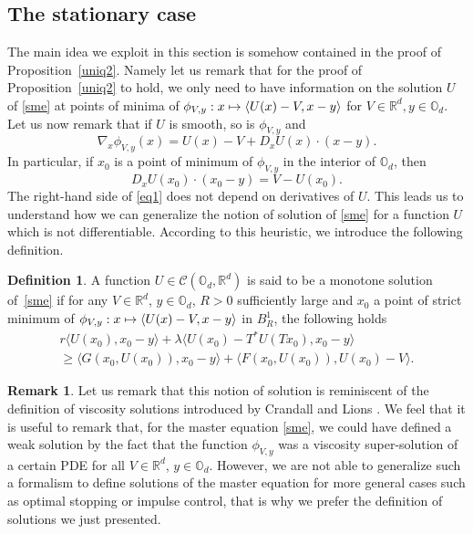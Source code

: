 \documentclass[10pt]{amsart}
\let\mathcal\mathscr
\newcommand\mto{\mathchoice{\longmapsto}{\mapsto}{\mapsto}{\mapsto}}
\theoremstyle{definition}
\newtheorem{Def}{Definition}[section]
\newtheorem{Rem}{Remark}[section]
\begin{document}
\subsection{The stationary case}
The main idea we exploit in this section is somehow contained in the proof of Proposition~\ref{uniq2}. Namely let us remark that for the proof of Proposition~\ref{uniq2} to hold, we only need to have information on the solution $U$ of \eqref{sme} at points of minima of $\phi_{V,y}: x \mto \langle U(x)-V, x-y\rangle$ for $V \in \mathbb{R}^d, y \in \mathbb{O}_d$. Let us now remark that if $U$ is smooth, so is $\phi_{V,y}$ and
\begin{equation*}
\nabla_x \phi_{V,y}(x) = U(x)-V+D_x U(x)\cdot(x-y).
\end{equation*}
In particular, if $x_0$ is a point of minimum of $\phi_{V,y}$ in the interior of $\mathbb{O}_d$, then
\begin{equation}\label{eq1}
D_x U(x_0)\cdot(x_0-y) =V-U(x_0).
\end{equation}
The right-hand side of \eqref{eq1} does not depend on derivatives of $U$. This leads us to understand how we can generalize the notion of solution of \eqref{sme} for a function $U$ which is not differentiable. According to this heuristic, we introduce the following definition.
\begin{Def}\label{defmons}
A function $U \in \mathcal{C}(\mathbb{O}_d, \mathbb{R}^d)$ is said to be a monotone solution of~\eqref{sme} if for any $V \in \mathbb{R}^d$, $y \in \mathbb{O}_d$, $R>0$ sufficiently large and $x_0$ a point of strict minimum of $\phi_{V,y}: x \mto \langle U(x)-V, x-y\rangle$ in $B^1_R$, the following holds
\begin{multline}\label{smon}
r\langle U(x_0), x_0-y\rangle + \lambda \langle U(x_0)-T^*U(Tx_0),x_0-y\rangle \\
\geq
 \langle G(x_0, U(x_0)), x_0-y\rangle+\langle F(x_0,U(x_0)), U(x_0)-V\rangle.
\end{multline}
\end{Def}
\begin{Rem}
Let us remark that this notion of solution is reminiscent of the definition of viscosity solutions introduced by Crandall and Lions \cite{crandall1983viscosity}. We feel that it is useful to remark that, for the master equation \eqref{sme}, we could have defined a weak solution by the fact that the function $\phi_{V,y}$ was a viscosity super-solution of a certain PDE for all $V \in \mathbb{R}^d$, $y \in \mathbb{O}_d$. However, we are not able to generalize such a formalism to define solutions of the master equation for more general cases such as optimal stopping or impulse control, that is why we prefer the definition of solutions we just presented.
\end{Rem}
\end{document}
